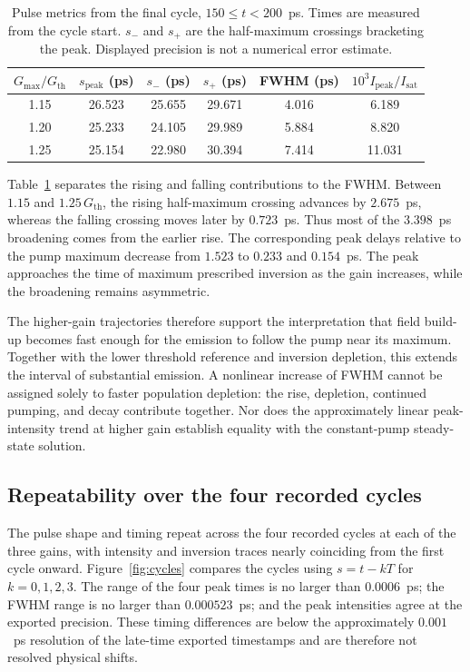 \documentclass[9pt]{osa-supplemental-document}
\begin{document}
\begin{table}[htbp]
\centering
\caption{Pulse metrics from the final cycle, $150\leq t<200$~ps. Times are measured from the cycle start. $s_-$ and $s_+$ are the half-maximum crossings bracketing the peak. Displayed precision is not a numerical error estimate.}
\label{tab:metrics}
\begin{tabular}{@{}cccccc@{}}
\toprule
$G_{\max}/G_{\mathrm{th}}$ & $s_{\mathrm{peak}}$ (ps) & $s_-$ (ps) & $s_+$ (ps) & FWHM (ps) & $10^3I_{\mathrm{peak}}/I_{\mathrm{sat}}$\\
\midrule
1.15 & 26.523 & 25.655 & 29.671 & 4.016 & 6.189\\
1.20 & 25.233 & 24.105 & 29.989 & 5.884 & 8.820\\
1.25 & 25.154 & 22.980 & 30.394 & 7.414 & 11.031\\
\bottomrule
\end{tabular}
\end{table}

Table~\ref{tab:metrics} separates the rising and falling contributions to the FWHM. Between $1.15$ and $1.25\,G_{\mathrm{th}}$, the rising half-maximum crossing advances by $2.675$~ps, whereas the falling crossing moves later by $0.723$~ps. Thus most of the $3.398$~ps broadening comes from the earlier rise. The corresponding peak delays relative to the pump maximum decrease from $1.523$ to $0.233$ and $0.154$~ps. The peak approaches the time of maximum prescribed inversion as the gain increases, while the broadening remains asymmetric.

The higher-gain trajectories therefore support the interpretation that field build-up becomes fast enough for the emission to follow the pump near its maximum. Together with the lower threshold reference and inversion depletion, this extends the interval of substantial emission. A nonlinear increase of FWHM cannot be assigned solely to faster population depletion: the rise, depletion, continued pumping, and decay contribute together. Nor does the approximately linear peak-intensity trend at higher gain establish equality with the constant-pump steady-state solution.

\subsection{Repeatability over the four recorded cycles}
The pulse shape and timing repeat across the four recorded cycles at each of the three gains, with intensity and inversion traces nearly coinciding from the first cycle onward. Figure~\ref{fig:cycles} compares the cycles using $s=t-kT$ for $k=0,1,2,3$. The range of the four peak times is no larger than $0.0006$~ps; the FWHM range is no larger than $0.000523$~ps; and the peak intensities agree at the exported precision. These timing differences are below the approximately $0.001$~ps resolution of the late-time exported timestamps and are therefore not resolved physical shifts.
\end{document}
